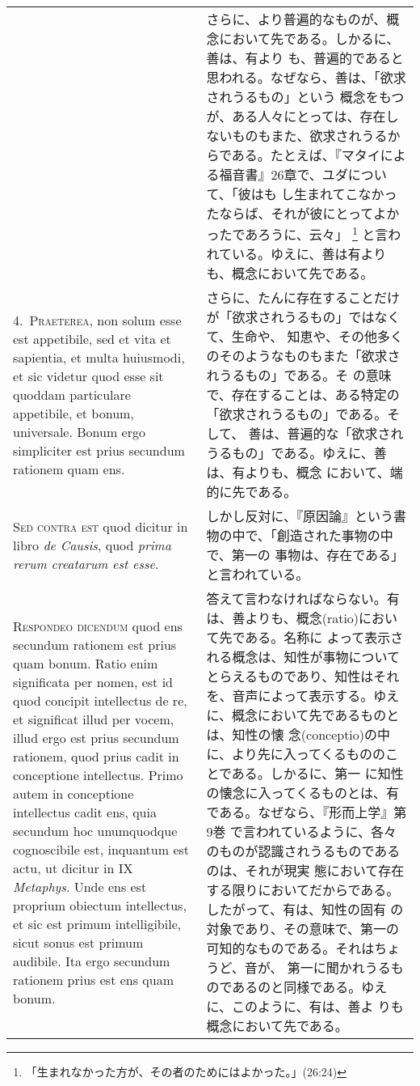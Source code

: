 \documentclass[10pt]{jsarticle}
\begin{document}
\begin{longtable}{p{21em}p{21em}}
&

さらに、より普遍的なものが、概念において先である。しかるに、善は、有より
 も、普遍的であると思われる。なぜなら、善は、「欲求されうるもの」という
 概念をもつが、ある人々にとっては、存在しないものもまた、欲求されうるか
 らである。たとえば、『マタイによる福音書』26章で、ユダについて、「彼はも
 し生まれてこなかったならば、それが彼にとってよかったであろうに、云々」
 \footnote{「生まれなかった方が、その者のためにはよかった。」(26:24)}
 と言われている。ゆえに、善は有よりも、概念において先である。


\\

4.~{\scshape Praeterea}, non solum esse est appetibile, sed et vita et
 sapientia, et multa huiusmodi, et sic videtur quod esse sit quoddam
 particulare appetibile, et bonum, universale. Bonum ergo simpliciter
 est prius secundum rationem quam ens.

&

さらに、たんに存在することだけが「欲求されうるもの」ではなくて、生命や、
 知恵や、その他多くのそのようなものもまた「欲求されうるもの」である。そ
 の意味で、存在することは、ある特定の「欲求されうるもの」である。そして、
 善は、普遍的な「欲求されうるもの」である。ゆえに、善は、有よりも、概念
 において、端的に先である。

\\

{\scshape Sed contra est} quod dicitur in libro {\itshape de Causis},
 quod {\itshape prima rerum creatarum est esse}.

&

しかし反対に、『原因論』という書物の中で、「創造された事物の中で、第一の
 事物は、存在である」と言われている。

\\


{\scshape Respondeo dicendum} quod ens secundum rationem est prius quam
 bonum. Ratio enim significata per nomen, est id quod concipit
 intellectus de re, et significat illud per vocem, illud ergo est prius
 secundum rationem, quod prius cadit in conceptione intellectus. Primo
 autem in conceptione intellectus cadit ens, quia secundum hoc
 unumquodque cognoscibile est, inquantum est actu, ut dicitur in IX
 {\itshape Metaphys}. Unde ens est proprium obiectum intellectus, et sic
 est primum intelligibile, sicut sonus est primum audibile. Ita ergo
 secundum rationem prius est ens quam bonum.

&

答えて言わなければならない。有は、善よりも、概念(ratio)において先である。名称に
 よって表示される概念は、知性が事物についてとらえるものであり、知性はそれ
 を、音声によって表示する。ゆえに、概念において先であるものとは、知性の懐
 念(conceptio)の中に、より先に入ってくるもののことである。しかるに、第一
 に知性の懐念に入ってくるものとは、有である。なぜなら、『形而上学』第9巻
 で言われているように、各々のものが認識されうるものであるのは、それが現実
 態において存在する限りにおいてだからである。したがって、有は、知性の固有
 の対象であり、その意味で、第一の可知的なものである。それはちょうど、音が、
 第一に聞かれうるものであるのと同様である。ゆえに、このように、有は、善よ
 りも概念において先である。


\end{longtable}
\end{document}
